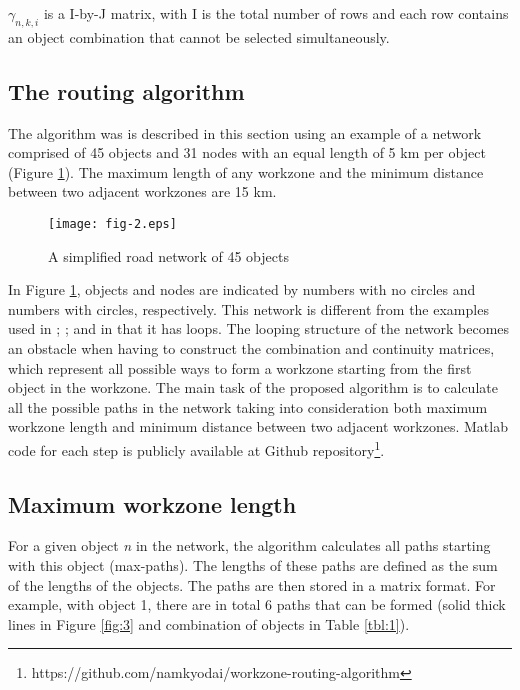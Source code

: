 \documentclass[a4paper,3p,times,authoryear]{elsarticle}
\begin{document}
${\gamma _{n,k,i}}$ is a I-by-J matrix, with I is the total number of rows and
each row contains an object combination that cannot be selected simultaneously.

\subsection{The routing algorithm} \label{routingalgorithm}
%
The algorithm was is described in this section using an example of a network
comprised of 45 objects and 31 nodes with an equal length of 5 km per object
(Figure \ref{fig:2}). The maximum length of any workzone and the minimum distance
between two adjacent workzones are 15 km.

\begin{figure}[H]
\begin{center}
\texttt{[image: fig-2.eps]}
\caption{A simplified road network of 45 objects}\label{fig:2}
\end{center}
\end{figure}

In Figure \ref{fig:2}, objects and nodes are indicated by numbers with no
circles and numbers with circles, respectively. This network is different from
the examples used in \cite{Hajdin2005}; \cite{Hajdin2007}; and
\cite{Lethanh2014b} in that it has loops. The looping structure of the network
becomes an obstacle when having to construct the combination and continuity
matrices, which represent all possible ways to form a workzone starting from the
first object in the workzone. The main task of the proposed algorithm is to
calculate all the possible paths in the network taking into consideration both
maximum workzone length and minimum distance between two adjacent workzones.
Matlab code for each step is publicly available at Github
repository\footnote{https://github.com/namkyodai/workzone-routing-algorithm}.
\subsection{Maximum workzone length}

For a given object \textit{n }in the network, the algorithm calculates all paths
starting with this object (max-paths). The lengths of these paths are defined as
the sum of the lengths of the objects. The paths are then stored in a matrix
format. For example, with object 1, there are in total 6 paths that can be formed
(solid thick lines in Figure \ref{fig:3} and combination of objects in Table
\ref{tbl:1}).
\end{document}
